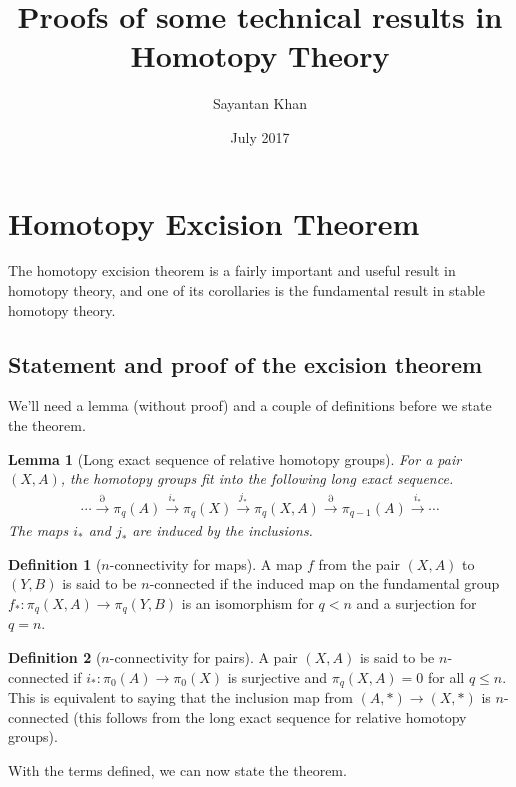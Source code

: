 \documentclass[12pt, notitlepage]{article}
\title{Proofs of some technical results in Homotopy Theory}
\author{Sayantan Khan}
\date{July 2017}
\newtheorem{lem}[thm]{Lemma}
\theoremstyle{definition}
\newtheorem{defn}{Definition}[section]
\begin{document}
\maketitle

\tableofcontents


\newpage

\section{Homotopy Excision Theorem}
\label{sec:hom-exc-theor}

The homotopy excision theorem is a fairly important and useful result in homotopy theory, and one of
its corollaries is the fundamental result in stable homotopy theory.

\subsection{Statement and proof of the excision theorem}
\label{sec:stat-proof-excis}

We'll need a lemma (without proof) and a couple of definitions before we state the theorem.

\begin{lem}[Long exact sequence of relative homotopy groups]
  For a pair $(X,A)$, the homotopy groups fit into the following long exact sequence.
  \begin{align*}
    \cdots \xrightarrow{\partial} \pi_q(A) \xrightarrow{i_{\ast}} \pi_q(X) \xrightarrow{j_{\ast}}
    \pi_q(X,A) \xrightarrow{\partial} \pi_{q-1}(A) \xrightarrow{i_{\ast}}\cdots
  \end{align*}
  The maps $i_{\ast}$ and $j_{\ast}$ are induced by the inclusions.
\end{lem}

\begin{defn}[$n$-connectivity for maps]
  A map $f$ from the pair $(X,A)$ to $(Y,B)$ is said to be $n$-connected if the induced map on the
  fundamental group $f_{\ast}: \pi_q(X,A) \to \pi_q(Y,B)$ is an isomorphism for $q < n$ and a
  surjection for $q=n$.
\end{defn}

\begin{defn}[$n$-connectivity for pairs]
  A pair $(X,A)$ is said to be $n$-connected if $i_{\ast}: \pi_0(A) \to \pi_0(X)$ is surjective and
  $\pi_q(X,A) = 0$ for all $q \leq n$. This is equivalent to saying that the inclusion map from
  $(A, \ast) \to (X, \ast)$ is $n$-connected (this follows from the long exact sequence for relative
  homotopy groups).
\end{defn}
With the terms defined, we can now state the theorem.
\end{document}
